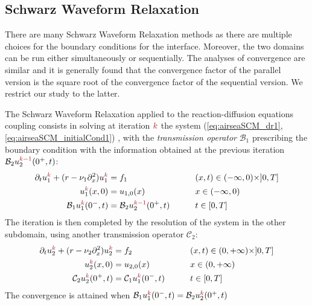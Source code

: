 \subsection{Schwarz Waveform Relaxation}
\label{sec:airseaSCM_SWR}
There are many Schwarz Waveform Relaxation methods
as there are multiple choices for the
boundary conditions for the interface. Moreover,
the two domains can be run either simultaneously or
sequentially. The analyses of convergence are similar and it
is generally found that the convergence factor of the parallel
version is the square root of the convergence factor
of the sequential version. We restrict our study to the latter.
\par
The Schwarz Waveform Relaxation applied to
the reaction-diffusion equations coupling consists in solving
at iteration ${\emphase{k}}$ the system
(\ref{eq:airseaSCM_dr1}, \ref{eq:airseaSCM_initialCond1})
, with the \textit{transmission operator}
${\mathcal B}_1$ prescribing the boundary condition
with the information obtained at the
previous iteration ${\mathcal B}_2 u_2^{\emphase{k-1}}(0^+,t)$:
\begin{subequations}
\begin{align}
	\partial_t u^{{\emphase{k}}}_1 +( r - \nu_1 \partial_x^2) u^{\emphase{k}}_1 &= f_1  &\qquad& (x,t) \in (-\infty,0) \times ]0,T]  \\
	u_1^{\emphase{k}}(x,0) &= u_{1,0}(x)   &\qquad&  x \in (-\infty,0)  \\
	{\mathcal B}_1 u_1^{\emphase{k}}(0^-,t) &= {\mathcal B}_2 u_2^{\emphase{k-1}}(0^+,t) &\qquad& t \in [0,T] 
\end{align}
\end{subequations}
The iteration is then completed by the resolution
of the system in the other subdomain, using another
transmission operator ${\mathcal C}_2$:
\begin{subequations}
\begin{align}
	\partial_t u^{\emphase{k}}_2 + ( r - \nu_2 \partial_x^2) u^{\emphase{k}}_2  &= f_2  &\qquad& (x,t) \in (0,+\infty) \times ]0,T] \\
	u^{\emphase{k}}_2(x,0) &= u_{2,0}(x)   &\qquad&  x \in (0,+\infty) \\
	{\mathcal C}_2 u_2^{\emphase{k}}(0^+,t) &= {\mathcal C}_1 u_1^{{\emphase{k}}}(0^-,t) &\qquad& t \in [0,T] \label{eq:airseaSCM_SWR-for-u2-interface}
\end{align}
\label{eq:airseaSCM_SWR-for-u2}
\end{subequations}
The convergence is attained
when ${\mathcal B}_1 u_1^{\emphase{k}}(0^-,t) = {\mathcal B}_2 u_2^{{\emphase{k}}}(0^+,t)$
